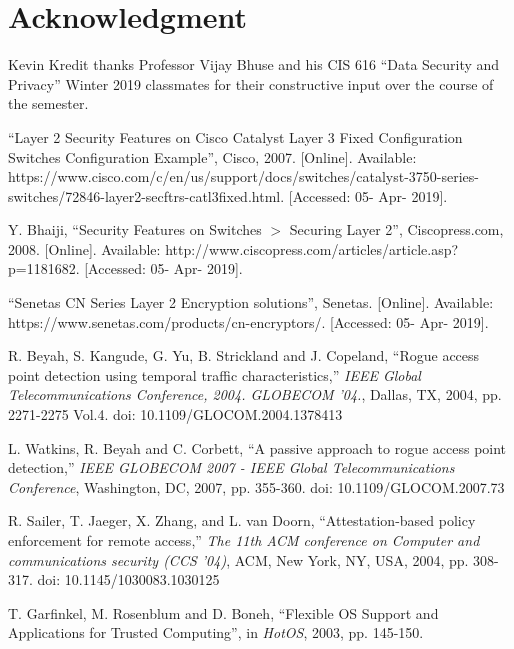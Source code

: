 \documentclass[journal]{IEEEtran}
\begin{document}


\section*{Acknowledgment}
Kevin Kredit thanks Professor Vijay Bhuse and his CIS 616 ``Data Security and Privacy'' Winter 2019
classmates for their constructive input over the course of the semester.


\begin{thebibliography}{00}

 ``Layer 2 Security Features on Cisco Catalyst Layer 3 Fixed Configuration Switches
Configuration Example'', Cisco, 2007. [Online]. Available:
https://www.cisco.com/c/en/us/support/docs/switches/catalyst-3750-series-switches/72846-layer2-secftrs-catl3fixed.html.
 [Accessed: 05- Apr- 2019].

 Y. Bhaiji, ``Security Features on Switches $>$ Securing Layer 2'', Ciscopress.com,
2008. [Online]. Available: http://www.ciscopress.com/articles/article.asp?p=1181682. [Accessed: 05-
Apr- 2019].

 ``Senetas CN Series Layer 2 Encryption solutions'', Senetas. [Online]. Available:
https://www.senetas.com/products/cn-encryptors/. [Accessed: 05- Apr- 2019].

 R. Beyah, S. Kangude, G. Yu, B. Strickland and J. Copeland, ``Rogue access point
detection using temporal traffic characteristics,'' \textit{IEEE Global Telecommunications
Conference, 2004. GLOBECOM '04.}, Dallas, TX, 2004, pp. 2271-2275 Vol.4. doi:
10.1109/GLOCOM.2004.1378413

 L. Watkins, R. Beyah and C. Corbett, ``A passive approach to rogue access point
detection,''  \textit{IEEE GLOBECOM 2007 - IEEE Global Telecommunications Conference}, Washington,
DC, 2007, pp. 355-360. doi: 10.1109/GLOCOM.2007.73

 R. Sailer, T. Jaeger, X. Zhang, and L. van Doorn, ``Attestation-based policy
enforcement for remote access,'' \textit{The 11th ACM conference on Computer and communications
security (CCS '04)}, ACM, New York, NY, USA, 2004, pp. 308-317. doi: 10.1145/1030083.1030125

 T. Garfinkel, M. Rosenblum and D. Boneh, ``Flexible OS Support and Applications for
Trusted Computing'', in \textit{HotOS}, 2003, pp. 145-150.

\end{thebibliography}
\end{document}
